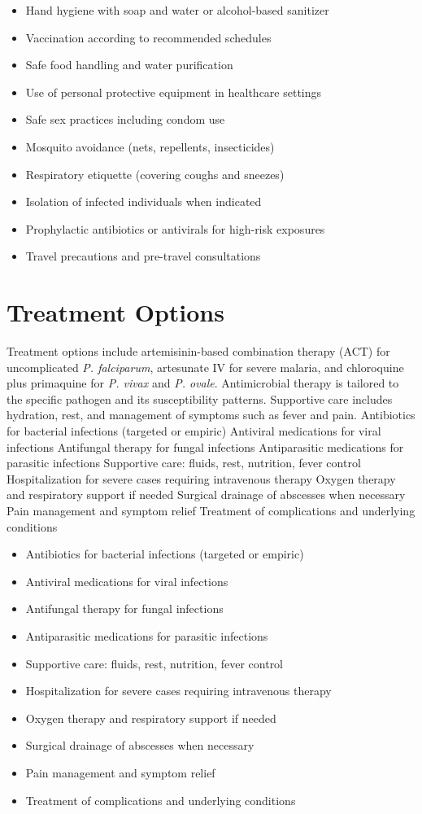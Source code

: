 \begin{itemize}[noitemsep]
  \item Hand hygiene with soap and water or alcohol-based sanitizer
  \item Vaccination according to recommended schedules
  \item Safe food handling and water purification
  \item Use of personal protective equipment in healthcare settings
  \item Safe sex practices including condom use
  \item Mosquito avoidance (nets, repellents, insecticides)
  \item Respiratory etiquette (covering coughs and sneezes)
  \item Isolation of infected individuals when indicated
  \item Prophylactic antibiotics or antivirals for high-risk exposures
  \item Travel precautions and pre-travel consultations
\end{itemize}
\section{Treatment Options}
Treatment options include artemisinin-based combination therapy (ACT) for uncomplicated \textit{P. falciparum}, artesunate IV for severe malaria, and chloroquine plus primaquine for \textit{P. vivax} and \textit{P. ovale}. Antimicrobial therapy is tailored to the specific pathogen and its susceptibility patterns. Supportive care includes hydration, rest, and management of symptoms such as fever and pain. Antibiotics for bacterial infections (targeted or empiric) Antiviral medications for viral infections Antifungal therapy for fungal infections Antiparasitic medications for parasitic infections Supportive care: fluids, rest, nutrition, fever control Hospitalization for severe cases requiring intravenous therapy Oxygen therapy and respiratory support if needed Surgical drainage of abscesses when necessary Pain management and symptom relief Treatment of complications and underlying conditions

\begin{itemize}[noitemsep]
  \item Antibiotics for bacterial infections (targeted or empiric)
  \item Antiviral medications for viral infections
  \item Antifungal therapy for fungal infections
  \item Antiparasitic medications for parasitic infections
  \item Supportive care: fluids, rest, nutrition, fever control
  \item Hospitalization for severe cases requiring intravenous therapy
  \item Oxygen therapy and respiratory support if needed
  \item Surgical drainage of abscesses when necessary
  \item Pain management and symptom relief
  \item Treatment of complications and underlying conditions
\end{itemize}
